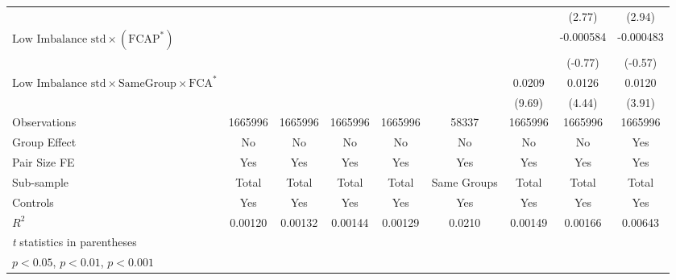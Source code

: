 {\begin{tabular}{l*{8}{c}}
                &                  &                  &                  &                  &                  &                  &   (2.77)         &   (2.94)         \\
[1em]
 $ \text{Low Imbalance std} \times (\text{FCAP}^*)  $ &                  &                  &                  &                  &                  &                  &-0.000584         &-0.000483         \\
                &                  &                  &                  &                  &                  &                  &  (-0.77)         &  (-0.57)         \\
[1em]
 $ \text{Low Imbalance std} \times {\text{SameGroup} } \times \text{FCA}^*  $ &                  &                  &                  &                  &                  &   0.0209\sym{***}&   0.0126\sym{***}&   0.0120\sym{***}\\
                &                  &                  &                  &                  &                  &   (9.69)         &   (4.44)         &   (3.91)         \\
\hline
Observations    &  1665996         &  1665996         &  1665996         &  1665996         &    58337         &  1665996         &  1665996         &  1665996         \\
Group Effect    &       No         &       No         &       No         &       No         &       No         &       No         &       No         &      Yes         \\
Pair Size FE    &      Yes         &      Yes         &      Yes         &      Yes         &      Yes         &      Yes         &      Yes         &      Yes         \\
Sub-sample      &    Total         &    Total         &    Total         &    Total         &Same Groups         &    Total         &    Total         &    Total         \\
Controls        &      Yes         &      Yes         &      Yes         &      Yes         &      Yes         &      Yes         &      Yes         &      Yes         \\
$ R^2 $         &  0.00120         &  0.00132         &  0.00144         &  0.00129         &   0.0210         &  0.00149         &  0.00166         &  0.00643         \\
\hline\hline
\multicolumn{9}{l}{\footnotesize \textit{t} statistics in parentheses}\\
\multicolumn{9}{l}{\footnotesize \sym{*} \(p<0.05\), \sym{**} \(p<0.01\), \sym{***} \(p<0.001\)}\\
\end{tabular}
}
